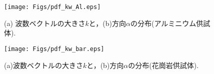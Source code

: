 \begin{figure}
\begin{center}
	\texttt{[image: Figs/pdf\_kw\_Al.eps]}
	\caption{(a) 波数ベクトルの大きさ$k$と，(b)方向$\alpha$の分布(アルミニウム供試体).}
	\label{fig:fig9}
\end{center}
	\vspace{-10mm}
\end{figure}
\begin{figure}
\begin{center}
	\texttt{[image: Figs/pdf\_kw\_bar.eps]}
	\caption{(a)波数ベクトルの大きさ$k$と，(b)方向$\alpha$の分布(花崗岩供試体).}
	\label{fig:fig10}
\end{center}
	\vspace{-10mm}
\end{figure}
